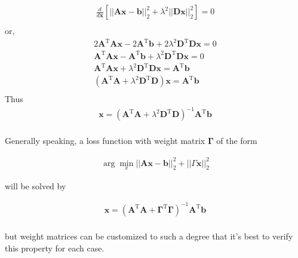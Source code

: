 \documentclass{article}
\newcommand{\x}{\mathbf{x}}
\newcommand{\A}{\mathbf{A}}
\newcommand{\B}{\mathbf{b}} %
\newcommand{\D}{\mathbf{D}}
\begin{document}
\begin{align*}
\frac{d}{d\x} \left[||\A\x-\B||_{2}^{2} + \lambda^2||\D \x||_{2}^{2} \right] = 0 \\
\end{align*}
or,
\begin{align*}
 2\A^{\textrm{T}}\A\x - 2\A^{\textrm{T}}\B + 2\lambda^2 \D^{\textrm{T}}\D\x = 0 \\
 \A^{\textrm{T}}\A\x - \A^{\textrm{T}}\B + \lambda^2 \D^{\textrm{T}}\D\x = 0 \\
 \A^{\textrm{T}}\A\x  + \lambda^2 \D^{\textrm{T}}\D\x = \A^{\textrm{T}}\B\\
  (\A^{\textrm{T}}\A  + \lambda^2 \D^{\textrm{T}}\D)\x = \A^{\textrm{T}}\B\\
\end{align*}
Thus
\begin{align*}
\x = (\A^{\textrm{T}}\A  + \lambda^2 \D^{\textrm{T}}\D)^{-1}\A^{\textrm{T}}\B\\
\end{align*}

Generally speaking, a loss function with weight matrix $\mathbf{\Gamma}$ of the form

\begin{align*}
\arg \min_{x}||\A\x-\B||_{2}^{2} + ||\textbf{$\Gamma$} \x||_{2}^{2}
\end{align*}

will be solved by 

\begin{align*}
\x = (\A^{\textrm{T}}\A  + \mathbf{\Gamma}^{\textrm{T}}\mathbf{\Gamma})^{-1}\A^{\textrm{T}}\B\\
\end{align*}

but weight matrices can be customized to such a degree that it's best to verify this property for each case. 
\end{document}
